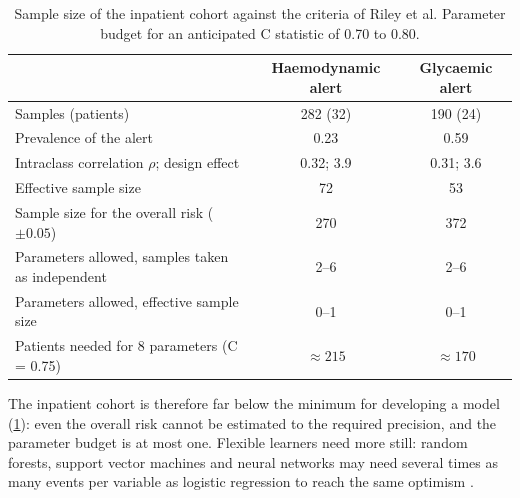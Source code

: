 \begin{table}[htbp]
\centering\footnotesize
\caption{Sample size of the inpatient cohort against the criteria of Riley et al. Parameter budget for an anticipated C statistic of 0.70 to 0.80.}\label{tab:sample-size}
\begin{tabular}{@{}lcc@{}}
\toprule
 & \textbf{Haemodynamic alert} & \textbf{Glycaemic alert} \\
\midrule
Samples (patients) & 282 (32) & 190 (24) \\
Prevalence of the alert & 0.23 & 0.59 \\
Intraclass correlation $\rho$; design effect & 0.32; 3.9 & 0.31; 3.6 \\
Effective sample size & 72 & 53 \\
Sample size for the overall risk ($\pm 0.05$) & 270 & 372 \\
Parameters allowed, samples taken as independent & 2--6 & 2--6 \\
Parameters allowed, effective sample size & 0--1 & 0--1 \\
Patients needed for 8 parameters (C = 0.75) & $\approx 215$ & $\approx 170$ \\
\bottomrule
\end{tabular}
\end{table}

The inpatient cohort is therefore far below the minimum for developing a model (\cref{tab:sample-size}): even the overall risk cannot be estimated to the required precision, and the parameter budget is at most one. Flexible learners need more still: random forests, support vector machines and neural networks may need several times as many events per variable as logistic regression to reach the same optimism \parencite{vanderploeg2014}.

